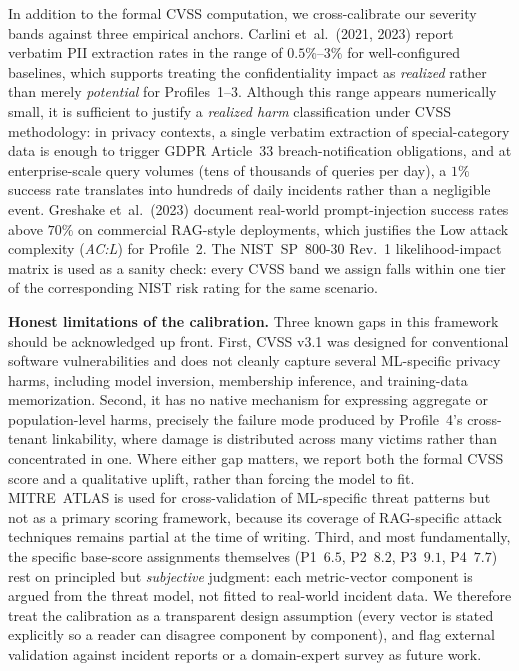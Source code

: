 \documentclass[12pt,a4paper]{report}
\begin{document}
In addition to the formal CVSS computation, we cross-calibrate our
severity bands against three empirical anchors. Carlini et~al.\ (2021,
2023) report verbatim PII extraction rates in the range of
$0.5\%$--$3\%$ for well-configured baselines, which supports treating the
confidentiality impact as \emph{realized} rather than merely
\emph{potential} for Profiles~1--3. Although this range appears
numerically small, it is sufficient to justify a \emph{realized harm}
classification under CVSS methodology: in privacy contexts, a single
verbatim extraction of special-category data is enough to trigger GDPR
Article~33 breach-notification obligations, and at enterprise-scale
query volumes (tens of thousands of queries per day), a $1\%$ success
rate translates into hundreds of daily incidents rather than a
negligible event. Greshake et~al.\ (2023) document real-world
prompt-injection success rates above $70\%$ on commercial RAG-style
deployments, which justifies the Low attack complexity (\emph{AC:L})
for Profile~2. The NIST~SP~800-30 Rev.~1 likelihood-impact matrix is
used as a sanity check: every CVSS band we assign falls within one
tier of the corresponding NIST risk rating for the same scenario.

\begin{limitbox}
\small\textbf{Honest limitations of the calibration.} Three known gaps
in this framework should be acknowledged up front. First, CVSS v3.1
was designed for conventional software vulnerabilities and does not
cleanly capture several ML-specific privacy harms, including model
inversion, membership inference, and training-data memorization.
Second, it has no native mechanism for expressing aggregate or
population-level harms, precisely the failure mode produced by
Profile~4's cross-tenant linkability, where damage is distributed
across many victims rather than concentrated in one. Where either gap
matters, we report both the formal CVSS score and a qualitative
uplift, rather than forcing the model to fit. MITRE~ATLAS is used for
cross-validation of ML-specific threat patterns but not as a primary
scoring framework, because its coverage of RAG-specific attack
techniques remains partial at the time of writing. Third, and most
fundamentally, the specific base-score assignments themselves (P1~$6.5$,
P2~$8.2$, P3~$9.1$, P4~$7.7$) rest on principled but \emph{subjective}
judgment: each metric-vector component is argued from the threat model,
not fitted to real-world incident data. We therefore treat the calibration
as a transparent design assumption (every vector is stated explicitly so a
reader can disagree component by component), and flag external validation
against incident reports or a domain-expert survey as future work.
\end{limitbox}
\end{document}
